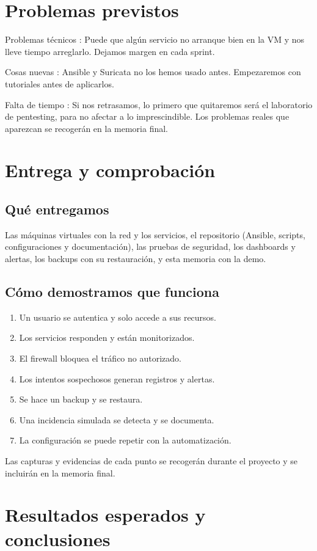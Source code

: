 \documentclass[11pt,a4paper]{report}
\begin{document}
\chapter{Problemas previstos}

\par\noindent\textbullet\quad  Problemas técnicos : Puede que algún servicio no arranque bien en la VM y nos lleve tiempo arreglarlo. Dejamos margen en cada sprint. 
\par\noindent\textbullet\quad  Cosas nuevas : Ansible y Suricata no los hemos usado antes. Empezaremos con tutoriales antes de aplicarlos. 
\par\noindent\textbullet\quad  Falta de tiempo : Si nos retrasamos, lo primero que quitaremos será el laboratorio de pentesting, para no afectar a lo imprescindible. Los problemas reales que aparezcan se recogerán en la memoria final.

\chapter{Entrega y comprobación}

\section{Qué entregamos}
 Las máquinas virtuales con la red y los servicios, el repositorio (Ansible, scripts, configuraciones y documentación), las pruebas de seguridad, los dashboards y alertas, los backups con su restauración, y esta memoria con la demo. 
\section{Cómo demostramos que funciona}
\begin{enumerate}

\item Un usuario se autentica y solo accede a sus recursos.
\item Los servicios responden y están monitorizados.
\item El firewall bloquea el tráfico no autorizado.
\item Los intentos sospechosos generan registros y alertas.
\item Se hace un backup y se restaura.
\item Una incidencia simulada se detecta y se documenta.
\item La configuración se puede repetir con la automatización.
\end{enumerate}
Las capturas y evidencias de cada punto se recogerán durante el proyecto y se incluirán en la memoria final.\chapter{Resultados esperados y conclusiones}
\end{document}
